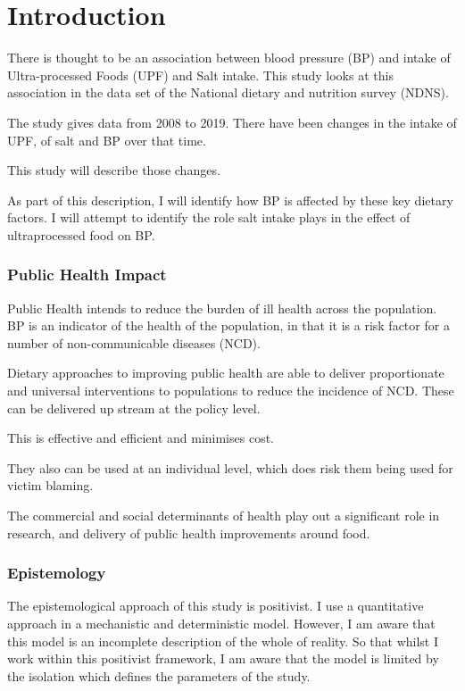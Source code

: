 \documentclass[
]{article}
\begin{document}
\newpage

\hypertarget{introduction}{%
\section{Introduction}\label{introduction}}

There is thought to be an association between blood pressure (BP) and
intake of Ultra-processed Foods (UPF) and Salt intake. This study looks
at this association in the data set of the National dietary and
nutrition survey (NDNS).

The study gives data from 2008 to 2019. There have been changes in the
intake of UPF, of salt and BP over that time.

This study will describe those changes.

As part of this description, I will identify how BP is affected by these
key dietary factors. I will attempt to identify the role salt intake
plays in the effect of ultraprocessed food on BP.

\hypertarget{public-health-impact}{%
\subsubsection{Public Health Impact}\label{public-health-impact}}

Public Health intends to reduce the burden of ill health across the
population. BP is an indicator of the health of the population, in that
it is a risk factor for a number of non-communicable diseases (NCD).

Dietary approaches to improving public health are able to deliver
proportionate and universal interventions to populations to reduce the
incidence of NCD. These can be delivered up stream at the policy level.

This is effective and efficient and minimises cost.

They also can be used at an individual level, which does risk them being
used for victim blaming.

The commercial and social determinants of health play out a significant
role in research, and delivery of public health improvements around
food.

\hypertarget{epistemology}{%
\subsubsection{Epistemology}\label{epistemology}}

The epistemological approach of this study is positivist. I use a
quantitative approach in a mechanistic and deterministic model. However,
I am aware that this model is an incomplete description of the whole of
reality. So that whilst I work within this positivist framework, I am
aware that the model is limited by the isolation which defines the
parameters of the study.
\end{document}

